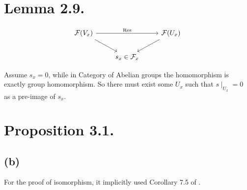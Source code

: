 \section{Lemma 2.9.}

\[\begin{tikzcd}
	{\mathcal F(V_x)} && {\mathcal F(U_x)} \\
	& {s_x\in\mathcal F_x}
	\arrow["{\text{Res}}", from=1-1, to=1-3]
	\arrow[from=1-1, to=2-2]
	\arrow[from=1-3, to=2-2]
\end{tikzcd}\]

Assume $s_x=0$, while in Category of Abelian groups the homomorphism is exactly group homomorphism. So there must exist some $U_x$ such that $s\mid_{U_x}=0$ as a pre-image of $s_x$.

\section{Proposition 3.1.}

\subsection{(b)}

For the proof of isomorphism, it implicitly used Corollary 7.5 of \cite{atiyah1994introduction}.